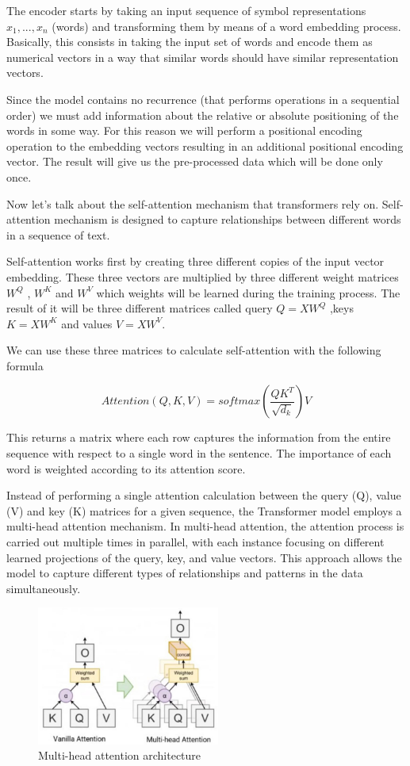 The encoder starts by taking an input sequence of symbol representations $x_1 , ... , x_n$ (words) and transforming them by means of a word embedding process. Basically, this consists in taking the input set of words and encode them as numerical vectors in a way that similar words should have similar representation vectors.

Since the model contains no recurrence (that performs operations in a sequential order) we must add information about the relative or absolute positioning of the words in some way. For this reason we will perform a positional encoding operation to the embedding vectors resulting in an additional positional encoding vector. The result will give us the pre-processed data which will be done only once.

\noindent Now let’s talk about the self-attention mechanism that transformers rely on. Self-attention mechanism is designed to capture relationships between different words in a sequence of text.

Self-attention works first by creating three different copies of the input vector embedding. These three vectors are multiplied by three different weight matrices $W^Q$ , $W^K$ and $W^V$ which weights will be learned during the training process. The result of it will be three different matrices called query $Q= X W^Q$ ,keys $K= X W^K$ and values $V = X W^V$.

\noindent We can use these three matrices to calculate self-attention with the following formula

$$ Attention(Q, K, V) = softmax \left( \frac{Q K^T}{\sqrt{d_k}} \right) V $$

This returns a matrix where each row captures the information from the entire sequence with respect to a single word in the sentence. The importance of each word is weighted according to its attention score.

\noindent Instead of performing a single attention calculation between the query (Q), value (V) and key (K) matrices for a given sequence, the Transformer model employs a multi-head attention mechanism. In multi-head attention, the attention process is carried out multiple times in parallel, with each instance focusing on different learned projections of the query, key, and value vectors. This approach allows the model to capture different types of relationships and patterns in the data simultaneously.

\begin{figure}[h]
    \centering
    \includegraphics[width=6cm]{Images/self-attention.jpg}
    \caption{Multi-head attention architecture}
\end{figure}

